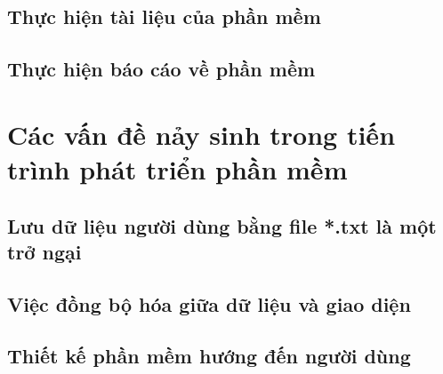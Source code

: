 \documentclass[12pt,a4paper]{report}
\begin{document}
	\section{Thực hiện tài liệu của phần mềm}
	\section{Thực hiện báo cáo về phần mềm}
\chapter{Các vấn đề nảy sinh trong tiến trình phát triển phần mềm}
	\section{Lưu dữ liệu người dùng bằng file *.txt là một trở ngại}
	\section{Việc đồng bộ hóa giữa dữ liệu và giao diện}
	\section{Thiết kế phần mềm hướng đến người dùng}
\end{document}
